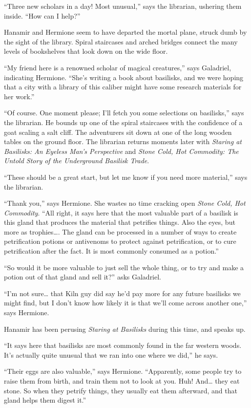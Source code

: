 \documentclass[smalldemyvopaper,11pt,twoside,onecolumn,openright,extrafontsizes]{memoir}
\begin{document}
``Three new scholars in a day! Most unusual,'' says the librarian,
ushering them inside. ``How can I help?''

Hanamir and Hermione seem to have departed the mortal plane, struck dumb
by the sight of the library. Spiral staircases and arched bridges
connect the many levels of bookshelves that look down on the wide floor.

``My friend here is a renowned scholar of magical creatures,'' says
Galadriel, indicating Hermione. ``She's writing a book about basilisks,
and we were hoping that a city with a library of this caliber might have
some research materials for her work.''

``Of course. One moment please; I'll fetch you some selections on
basilisks,'' says the librarian. He bounds up one of the spiral
staircases with the confidence of a goat scaling a salt cliff. The
adventurers sit down at one of the long wooden tables on the ground
floor. The librarian returns moments later with \emph{Staring at
Basilisks: An Eyeless Man's Perspective} and \emph{Stone Cold, Hot
Commodity: The Untold Story of the Underground Basilisk Trade}.

``These should be a great start, but let me know if you need more
material,'' says the librarian.

``Thank you,'' says Hermione. She wastes no time cracking open
\emph{Stone Cold, Hot Commodity}. ``All right, it says here that the
most valuable part of a basilisk is this gland that produces the
material that petrifies things. Also the eyes, but more as
trophies\ldots. The gland can be processed in a number of ways to create
petrification potions or antivenoms to protect against petrification, or
to cure petrification after the fact. It is most commonly consumed as a
potion.''

``So would it be more valuable to just sell the whole thing, or to try
and make a potion out of that gland and sell it?'' asks Galadriel.

``I'm not sure\ldots{} that Kiln guy did say he'd pay more for any
future basilisks we might find, but I don't know how likely it is that
we'll come across another one,'' says Hermione.

Hanamir has been perusing \emph{Staring at Basilisks} during this time,
and speaks up.

``It says here that basilisks are most commonly found in the far western
woods. It's actually quite unusual that we ran into one where we did,''
he says.

``Their eggs are also valuable,'' says Hermione. ``Apparently, some
people try to raise them from birth, and train them not to look at you.
Huh! And\ldots{} they eat stone. So when they petrify things, they
usually eat them afterward, and that gland helps them digest it.''
\end{document}
